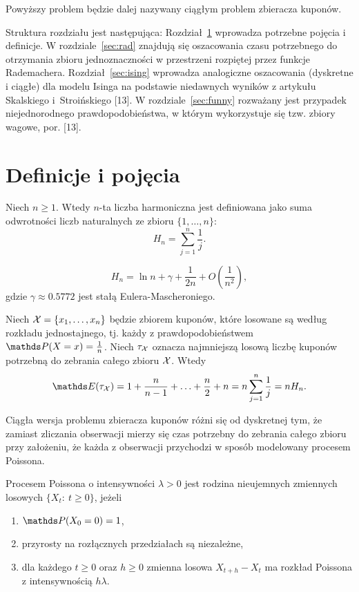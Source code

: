 \noindent
Powyższy problem będzie dalej nazywany ciągłym problem zbieracza kuponów.

\noindent
Struktura rozdziału jest następująca: Rozdział~\ref{sec:pre} wprowadza potrzebne pojęcia i definicje. W rozdziale~\ref{sec:rad} znajdują się oszacowania czasu potrzebnego do otrzymania zbioru jednoznaczności w przestrzeni rozpiętej przez funkcje Rademachera. Rozdział~\ref{sec:ising} wprowadza analogiczne oszacowania (dyskretne i ciągłe) dla modelu Isinga na podstawie niedawnych wyników z artykułu Skalskiego i~Stroi\'nskiego [13]. W rozdziale~\ref{sec:funny} rozważany jest przypadek niejednorodnego prawdopodobieństwa, w którym wykorzystuje się tzw. zbiory wagowe, por. [13].

\section{Definicje i pojęcia}\label{sec:pre}

\begin{definition}
Niech $n\geq 1$. Wtedy $n$-ta liczba harmoniczna jest definiowana jako suma odwrotności liczb naturalnych ze zbioru $\{1,\ldots,n\}$: 
$$H_n=\sum\limits_{j=1}^n\frac{1}{j}.$$
\end{definition}

\begin{remark} [5, str. 5]
$$H_n = \ln n + \gamma + \frac{1}{2n} + O\left(\frac{1}{n^2}\right),$$
gdzie $\gamma\approx 0.5772$ jest stałą Eulera-Mascheroniego.
\end{remark}

\begin{definition}
Niech $\mathcal{X}=\{x_1,\ldots,x_n\}$ będzie zbiorem kuponów, które losowane są według rozkładu jednostajnego, tj. każdy z prawdopodobieństwem $\PP(X=x)=\frac{1}{n}$. Niech $\tau_{\mathcal{X}}$ oznacza najmniejszą losową liczbę kuponów potrzebną do zebrania całego zbioru $\mathcal{X}$. Wtedy
$$
\EE(\tau_{\set{X}}) = 1 + \frac{n}{n-1} + \ldots + \frac{n}{2} + n = n \sum\limits_{j=1}^{n}\frac{1}{j} = nH_n.
$$
\end{definition}
\noindent
Ciągła wersja problemu zbieracza kuponów różni się od dyskretnej tym, że zamiast zliczania obserwacji mierzy się czas potrzebny do zebrania całego zbioru przy założeniu, że każda z obserwacji przychodzi w sposób modelowany procesem Poissona.

\begin{definition}
Procesem Poissona o intensywności $\lambda>0$ jest rodzina nieujemnych zmiennych losowych $\{X_t:\ t\geq 0\}$, jeżeli
\begin{enumerate}
    \item $\PP(X_0=0)=1$,
    \item przyrosty na rozłącznych przedziałach są niezależne,
    \item dla każdego $t\geq 0$ oraz $h\geq 0$ zmienna losowa $X_{t+h} - X_{t}$ ma rozkład Poissona z intensywnością $h\lambda$.
\end{enumerate}
\end{definition}


